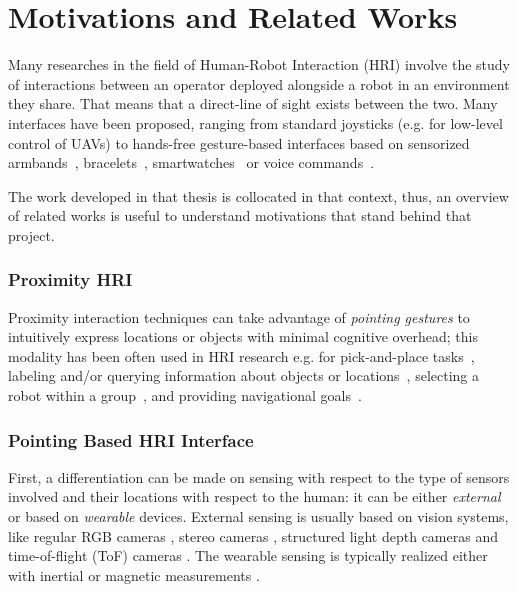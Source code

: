 \section*{Motivations and Related Works}
Many researches in the field of Human-Robot Interaction (HRI) involve the study of interactions between an operator deployed alongside a robot in an environment they share. That means that a direct-line of sight exists between the two. Many interfaces have been proposed, ranging from standard joysticks (e.g. for low-level control of UAVs) to hands-free gesture-based interfaces based on sensorized armbands~\cite{Wolf2013}, bracelets~\cite{Cacace2016,gromov2018video}, smartwatches~\cite{Villani2017} or voice commands~\cite{Gromov2016}.

The work developed in that thesis is collocated in that context, thus, an overview of related works is useful to understand motivations that stand behind that project.

\subsubsection*{Proximity HRI}
Proximity interaction techniques can take advantage of \emph{pointing gestures} to intuitively express locations or objects with minimal cognitive overhead; this modality has been often used in HRI research e.g. for pick-and-place tasks~\cite{Brooks2006,Droeschel2011,Grossmann2014,Cosgun2015}, labeling and/or querying information about objects or locations~\cite{Brooks2006,Pateraki2014,Akkil2016}, selecting a robot within a group~\cite{Nagi2014a,Pourmehr2013}, and providing navigational goals~\cite{VanDenBergh2011,Abidi2013,Wolf2013,Jevtic2015,Gromov2016,Tolgyessy2017,gromov2018video}.

\subsubsection*{Pointing Based HRI Interface}
First, a differentiation can be made on sensing with respect to the type of sensors involved and their locations with respect to the human: it can be either \emph{external} or based on \emph{wearable} devices.
External sensing is usually based on vision systems, like regular RGB cameras \cite{Pateraki2014,Monajjemi2016}, stereo cameras \cite{Nickel2003}, structured light depth cameras \cite{Cosgun2015} and time-of-flight (ToF) cameras \cite{Droeschel2011}. The wearable sensing is typically realized either with inertial \cite{Wolf2013,Sugiyama2013} or magnetic measurements \cite{Bolt1980,Nickel2003}. 

